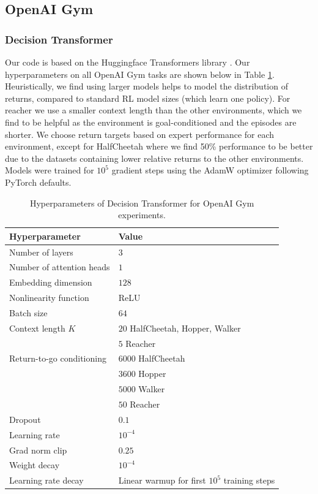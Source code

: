 \subsection{OpenAI Gym}

\subsubsection{Decision Transformer}

Our code is based on the Huggingface Transformers library \citep{wolf-etal-2020-transformers}.
Our hyperparameters on all OpenAI Gym tasks are shown below in Table \ref{tbl:gym_hyperparameters}.
Heuristically, we find using larger models helps to model the distribution of returns, compared to standard RL model sizes (which learn one policy).
For reacher we use a smaller context length than the other environments, which we find to be helpful as the environment is goal-conditioned and the episodes are shorter.
We choose return targets based on expert performance for each environment, except for HalfCheetah where we find 50\% performance to be better due to the datasets containing lower relative returns to the other environments.
Models were trained for $10^5$ gradient steps using the AdamW optimizer \citep{loshchilov2017adamw} following PyTorch defaults.

\begin{table}[ht]
\caption{Hyperparameters of Decision Transformer for OpenAI Gym experiments.}
\vskip 0.15in
\begin{center}
\begin{small}
\begin{tabular}{ll}
\toprule
\textbf{Hyperparameter} & \textbf{Value}  \\
\midrule
Number of layers & $3$  \\ 
Number of attention heads    & $1$  \\
Embedding dimension    & $128$  \\
Nonlinearity function & ReLU \\
Batch size   & $64$ \\
Context length $K$ & $20$ HalfCheetah, Hopper, Walker \\
               & $5$ Reacher \\
Return-to-go conditioning   & $6000$ HalfCheetah \\
                            & $3600$ Hopper \\
                            & $5000$ Walker \\
                            & $50$ Reacher \\
Dropout & $0.1$ \\
Learning rate & $10^{-4}$ \\
Grad norm clip & $0.25$ \\
Weight decay & $10^{-4}$ \\
Learning rate decay & Linear warmup for first $10^5$ training steps \\
\bottomrule
\end{tabular}
\end{small}
\label{tbl:gym_hyperparameters}
\end{center}
\end{table} 

